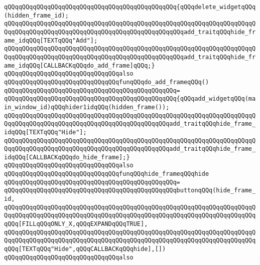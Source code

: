 \verb|qQQqqQQqqQQqqQQqqQQqqQQqqQQqqQQqqQQqqQQqqQQqqQQq{qQQqdelete_widgetqQQq(hidden_frame_id);|\newline
\verb|qQQqqQQqqQQqqQQqqQQqqQQqqQQqqQQqqQQqqQQqqQQqqQQqqQQqqQQqqQQqqQQqqQQqqQQqqQQqqQQqqQQqqQQqqQQqqQQqqQQqqQQqqQQqqQQqqQQqqQQqadd_traitqQQqhide_frame_idqQQq[TEXTqQQq"Add"];|\newline
\verb|qQQqqQQqqQQqqQQqqQQqqQQqqQQqqQQqqQQqqQQqqQQqqQQqqQQqqQQqqQQqqQQqqQQqqQQqqQQqqQQqqQQqqQQqqQQqqQQqqQQqqQQqqQQqqQQqqQQqqQQqadd_traitqQQqhide_frame_idqQQq[CALLBACKqQQqdo_add_frame]qQQq;}|\newline
\newline
\verb|qQQqqQQqqQQqqQQqqQQqqQQqqQQqqQQqalso|\newline
\verb|qQQqqQQqqQQqqQQqqQQqqQQqqQQqqQQqfunqQQqdo_add_frameqQQq()|\newline
\verb|qQQqqQQqqQQqqQQqqQQqqQQqqQQqqQQqqQQqqQQqqQQqqQQq=|\newline
\verb|qQQqqQQqqQQqqQQqqQQqqQQqqQQqqQQqqQQqqQQqqQQqqQQq{qQQqadd_widgetqQQq(main_window_id)qQQqhider1idqQQq(hidden_frame());|\newline
\verb|qQQqqQQqqQQqqQQqqQQqqQQqqQQqqQQqqQQqqQQqqQQqqQQqqQQqqQQqqQQqqQQqqQQqqQQqqQQqqQQqqQQqqQQqqQQqqQQqqQQqqQQqqQQqqQQqqQQqadd_traitqQQqhide_frame_idqQQq[TEXTqQQq"Hide"];|\newline
\verb|qQQqqQQqqQQqqQQqqQQqqQQqqQQqqQQqqQQqqQQqqQQqqQQqqQQqqQQqqQQqqQQqqQQqqQQqqQQqqQQqqQQqqQQqqQQqqQQqqQQqqQQqqQQqqQQqqQQqadd_traitqQQqhide_frame_idqQQq[CALLBACKqQQqdo_hide_frame];}|\newline
\newline
\verb|qQQqqQQqqQQqqQQqqQQqqQQqqQQqqQQqalso|\newline
\verb|qQQqqQQqqQQqqQQqqQQqqQQqqQQqqQQqfunqQQqhide_frameqQQqhide|\newline
\verb|qQQqqQQqqQQqqQQqqQQqqQQqqQQqqQQqqQQqqQQqqQQqqQQq=|\newline
\verb|qQQqqQQqqQQqqQQqqQQqqQQqqQQqqQQqqQQqqQQqqQQqqQQqbuttonqQQq(hide_frame_id,|\newline
\verb|qQQqqQQqqQQqqQQqqQQqqQQqqQQqqQQqqQQqqQQqqQQqqQQqqQQqqQQqqQQqqQQqqQQqqQQqqQQqqQQqqQQqqQQqqQQqqQQqqQQqqQQqqQQqqQQqqQQqqQQqqQQqqQQqqQQqqQQqqQQqqQQq[FILLqQQqONLY_X,qQQqEXPANDqQQqTRUE],|\newline
\verb|qQQqqQQqqQQqqQQqqQQqqQQqqQQqqQQqqQQqqQQqqQQqqQQqqQQqqQQqqQQqqQQqqQQqqQQqqQQqqQQqqQQqqQQqqQQqqQQqqQQqqQQqqQQqqQQqqQQqqQQqqQQqqQQqqQQqqQQqqQQqqQQq[TEXTqQQq"Hide",qQQqCALLBACKqQQqhide],[])|\newline
\newline
\verb|qQQqqQQqqQQqqQQqqQQqqQQqqQQqqQQqalso|\newline
